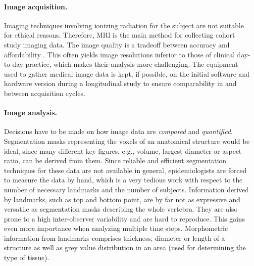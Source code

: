 \documentclass[journal]{style/vgtc} 			          %
\begin{document}
\paragraph{Image acquisition.} \label{ImageAcquisition} Imaging techniques involving ionizing radiation for the subject are not suitable for ethical reasons.
%
Therefore, MRI is the main method for collecting cohort study imaging data.
%
The image quality is a tradeoff between accuracy and affordability \cite{Preim2014}.
%
This often yields image resolutions inferior to those of clinical day-to-day practice, which makes their analysis more challenging.
The equipment used to gather medical image data is kept, if possible, on the initial software and hardware version during a longitudinal study to ensure comparability in and between acquisition cycles.

\paragraph{Image analysis.} \label{ImageAnalysis} Decisions have to be made on how image data are \emph{compared} and \emph{quantified}.
%
Segmentation masks representing the voxels of an anatomical structure would be ideal, since many different key figures, e.g., volume, largest diameter or aspect ratio, can be derived from them.
%
Since reliable and efficient segmentation techniques for these data are not available in general, epidemiologists are forced to measure the data by hand, which is a very tedious work with respect to the number of necessary landmarks and the number of subjects.
%
Information derived by landmarks, such as top and bottom point, are by far not as expressive and versatile as segmentation masks describing the whole vertebra.
%
They are also prone to a high inter-observer variability and are hard to reproduce.
%
This gains even more importance when analyzing multiple time steps.
%
Morphometric information from landmarks comprises thickness, diameter or length of a structure as well as grey value distribution in an area (used for determining the type of tissue).
\end{document}
